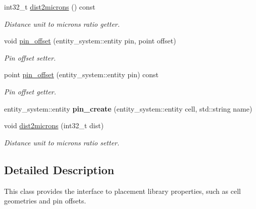 \begin{DoxyCompactItemize}
\item 
int32\-\_\-t \hyperlink{classophidian_1_1placement_1_1library_a418ab862570f88891352d4025b4d90b5}{dist2microns} () const 
\begin{DoxyCompactList}\small\item\em Distance unit to microns ratio getter. \end{DoxyCompactList}\item 
void \hyperlink{classophidian_1_1placement_1_1library_a41fcc54adf699be117338cc459500de7}{pin\-\_\-offset} (entity\-\_\-system\-::entity pin, point offset)
\begin{DoxyCompactList}\small\item\em Pin offset setter. \end{DoxyCompactList}\item 
point \hyperlink{classophidian_1_1placement_1_1library_ad22cfec375fe31cdc5ddd5e81816e496}{pin\-\_\-offset} (entity\-\_\-system\-::entity pin) const 
\begin{DoxyCompactList}\small\item\em Pin offset getter. \end{DoxyCompactList}\item 
\hypertarget{classophidian_1_1placement_1_1library_a458d555da32bf7d596d3041bb9a777aa}{entity\-\_\-system\-::entity {\bfseries pin\-\_\-create} (entity\-\_\-system\-::entity cell, std\-::string name)}\label{classophidian_1_1placement_1_1library_a458d555da32bf7d596d3041bb9a777aa}

\item 
void \hyperlink{classophidian_1_1placement_1_1library_aa421a90150a98aa9bfb26ceca82a89a1}{dist2microns} (int32\-\_\-t dist)
\begin{DoxyCompactList}\small\item\em Distance unit to microns ratio setter. \end{DoxyCompactList}\end{DoxyCompactItemize}


\subsection{Detailed Description}
This class provides the interface to placement library properties, such as cell geometries and pin offsets. 

